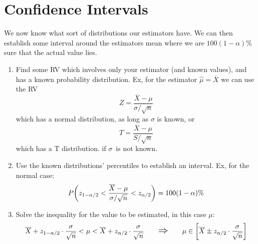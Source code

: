 \documentclass[12p,a4paper]{report}
\renewcommand{\bar}{\overline}
\newcommand{\lRightarrow}{\mathlarger{\mathlarger{\Rightarrow}}}
\begin{document}
\newpage
\section*{Confidence Intervals}
We now know what sort of distributions our estimators have. We can then establish some interval around the estimators mean where we are $100(1-\alpha)\%$ sure that the actual value lies.

\begin{tcolorbox}[width=\textwidth,colback={yellow},title={Deriving Confidence Intervals},colbacktitle=green,coltitle=black,fonttitle=\Large]

    \begin{enumerate}
        \item Find some RV which involves only your estimator (and known values), and has a known probability distribution. Ex, for the estimator $\hat{\mu} = \bar{X}$ we can use the RV
        \[ Z = \frac{\bar{X} - \mu}{\sigma/\sqrt{n}} \]
        which has a normal distribution, as long as $\sigma$ is known, or 
        \[ T = \frac{\bar{X} - \mu}{S/\sqrt{n}} \]
        which has a T distribution. if $\sigma$ is not known.

        \item Use the known distributions' percentiles to establish an interval. Ex, for the normal case:
        \[ P\qty(z_{1 - \alpha/2} < \frac{\bar{X} - \mu}{\sigma/\sqrt{n}} < z_{\alpha/2}) = 100(1-\alpha)\% \]

        \item Solve the inequality for the value to be estimated, in this case $\mu$:
        \[ \bar{X} + z_{1-\alpha/2}\cdot \frac{\sigma}{\sqrt{n}} < \mu < \bar{X} + z_{\alpha/2}\cdot \frac{\sigma}{\sqrt{n}} \quad\quad \lRightarrow \quad\quad \mu \in \qty[\bar{X} \pm z_{\alpha/2}\cdot \frac{\sigma}{\sqrt{n}}] \]
    \end{enumerate}

\end{tcolorbox}  
\end{document}
